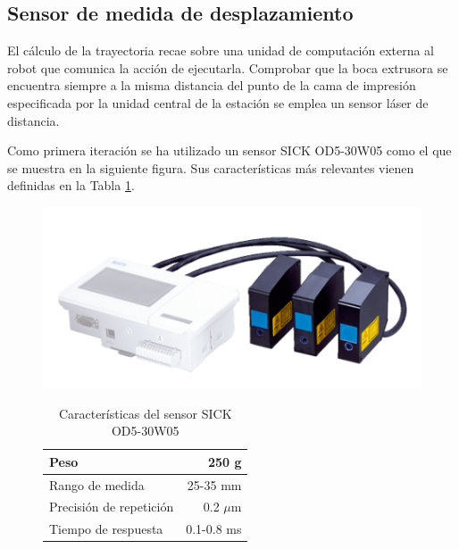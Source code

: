 \subsection{Sensor de medida de desplazamiento}
El cálculo de la trayectoria recae sobre una unidad de computación externa al robot que comunica la acción de ejecutarla. Comprobar que la boca extrusora se encuentra siempre a la misma distancia del punto de la cama de impresión especificada por la unidad central de la estación se emplea un sensor láser de distancia. 

Como primera iteración se ha utilizado un sensor SICK OD5-30W05 como el que se muestra en la siguiente figura. Sus características más relevantes vienen definidas en la Tabla \ref{tab:caracteristicas_sensor_sick_od5}.

\begin{table}[h!]
    \begin{subfigure}[h!]{0.45\textwidth}
        \includegraphics[scale=0.40]{figuras/sensor_SICK_1.png}
        \label{fig:articulaciones_UR}
    \end{subfigure}
    \hfill
    \begin{subfigure}[h!]{0.35\textwidth}
        \begin{tabular}{|l|r|}
            \hline
            Peso & 250 g \\
            \hline
            Rango de medida & 25-35 mm \\
            \hline
            Precisión de repetición & 0.2 $\mu$m \\
            \hline
            Tiempo de respuesta & 0.1-0.8 ms \\
            \hline
        \end{tabular}
        \label{tab:caracteristicas_UR_tabla}
    \end{subfigure}
    \caption{Características del sensor SICK OD5-30W05 \cite{manuel_sensor_laser_sick_od5_30w05}}
    \label{tab:caracteristicas_sensor_sick_od5}
\end{table}

